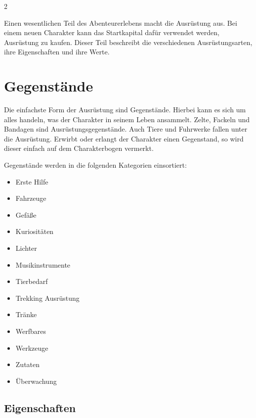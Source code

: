 \label{ch:equipment}

\begin{multicols}{2}

Einen wesentlichen Teil des Abenteurerlebens macht die Ausrüstung aus. Bei einem neuen Charakter kann das Startkapital dafür verwendet werden, Ausrüstung zu kaufen. Dieser Teil beschreibt die verschiedenen Ausrüstungsarten, ihre Eigenschaften und ihre Werte.

\section{Gegenstände}

Die einfachste Form der Ausrüstung sind Gegenstände. Hierbei kann es sich um alles handeln, was der Charakter in seinem Leben ansammelt. Zelte, Fackeln und Bandagen sind Ausrüstungsgegenstände. Auch Tiere und Fuhrwerke fallen unter die Ausrüstung. Erwirbt oder erlangt der Charakter einen Gegenstand, so wird dieser einfach auf dem Charakterbogen vermerkt.

Gegenstände werden in die folgenden Kategorien einsortiert:
\begin{itemize}
    \item Erste Hilfe
    \item Fahrzeuge
    \item Gefäße
    \item Kuriositäten
    \item Lichter
    \item Musikinstrumente
    \item Tierbedarf
    \item Trekking Ausrüstung
    \item Tränke
    \item Werfbares
    \item Werkzeuge
    \item Zutaten
    \item Überwachung
\end{itemize}

\subsection{Eigenschaften}


\end{multicols}
